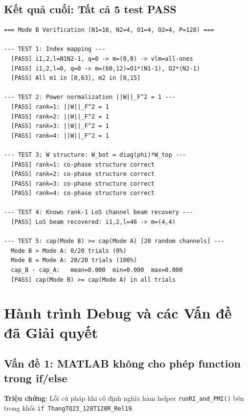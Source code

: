 \documentclass[11pt,a4paper]{article}
\begin{document}
\subsection{Kết quả cuối: Tất cả 5 test PASS}

\begin{tcolorbox}[colback=green!5,colframe=green!50,title=Kết quả kiểm tra Mode B]
\begin{verbatim}
=== Mode B Verification (N1=16, N2=4, O1=4, O2=4, P=128) ===

--- TEST 1: Index mapping ---
  [PASS] i1,2,l=N1N2-1, q=0 -> m=(0,0) -> vlm=all-ones
  [PASS] i1,2,l=0, q=0 -> m=(60,12)=O1*(N1-1), O2*(N2-1)
  [PASS] All m1 in [0,63], m2 in [0,15]

--- TEST 2: Power normalization ||W||_F^2 = 1 ---
  [PASS] rank=1: ||W||_F^2 = 1
  [PASS] rank=2: ||W||_F^2 = 1
  [PASS] rank=3: ||W||_F^2 = 1
  [PASS] rank=4: ||W||_F^2 = 1

--- TEST 3: W structure: W_bot = diag(phi)*W_top ---
  [PASS] rank=1: co-phase structure correct
  [PASS] rank=2: co-phase structure correct
  [PASS] rank=3: co-phase structure correct
  [PASS] rank=4: co-phase structure correct

--- TEST 4: Known rank-1 LoS channel beam recovery ---
  [PASS] LoS beam recovered: i1,2,l=46 -> m=(4,4)

--- TEST 5: cap(Mode B) >= cap(Mode A) [20 random channels] ---
  Mode B > Mode A: 0/20 trials (0%)
  Mode B = Mode A: 20/20 trials (100%)
  cap_B - cap_A:   mean=0.000  min=0.000  max=0.000
  [PASS] cap(Mode B) >= cap(Mode A) in all trials
\end{verbatim}
\end{tcolorbox}

\section{Hành trình Debug và các Vấn đề đã Giải quyết}

\subsection{Vấn đề 1: MATLAB không cho phép function trong if/else}

\noindent\textbf{Triệu chứng}: Lỗi cú pháp khi cố định nghĩa hàm helper
\texttt{runRI\_and\_PMI()} bên trong khối \texttt{if ThangTQ23\_128T128R\_Rel19}.
\end{document}
